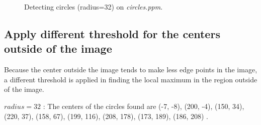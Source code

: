 \documentclass[paper=a4, fontsize=11pt]{scrartcl}
\numberwithin{equation}{section}		%
\numberwithin{figure}{section}			%
\begin{document}
\begin{figure}[h]
\centering
{}
\caption{Detecting circles (radius=32) on \emph{circles.ppm}.}
\label{fig:hough:circle:48}
\end{figure}

\subsection{Apply different threshold for the centers outside of the image}

Because the center outside the image tends to make less edge points in the image, a different threshold is applied in finding the local maximum in the region outside of the image.

$ radius = 32 $ : The centers of the circles found are (-7, -8), (200, -4), (150, 34), (220, 37), (158, 67), (199, 116), (208, 178), (173, 189), (186, 208) .
\end{document}
